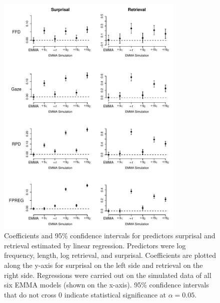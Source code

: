 \begin{subappendices}
\begin{figure}[!htbp]
\begin{center}
\includegraphics[width=0.8\textwidth]{figures/fig-lms}
\end{center}
\caption{Coefficients and 95\% confidence intervals for predictors surprisal and retrieval estimated by linear regression.  Predictors were log frequency, length, log retrieval, and surprisal.  Coefficients are plotted along the y-axis for surprisal on the left side and retrieval on the right side. Regressions were carried out on the simulated data of all six EMMA models (shown on the x-axis).  95\% confidence intervals that do not cross 0 indicate statistical significance at $\alpha = 0.05.$}
\label{fig:pred}
\end{figure}


\end{subappendices}
